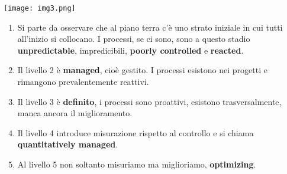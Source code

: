 \texttt{[image: img3.png]} %

\begin{enumerate}
	\item Si parte da osservare che al piano terra c'è uno strato iniziale in cui tutti all'inizio si collocano. I processi, se ci sono, sono a questo stadio \textbf{unpredictable}, impredicibili, \textbf{poorly controlled} e \textbf{reacted}.
	\item Il livello 2 è \textbf{managed}, cioè gestito. I processi esistono nei progetti e rimangono prevalentemente reattivi.
	\item  Il livello 3 è \textbf{definito}, i processi sono proattivi, esistono trasversalmente, manca ancora il miglioramento.
	\item Il livello 4 introduce misurazione rispetto al controllo e si chiama \textbf{quantitatively managed}.
	\item Al livello 5 non soltanto misuriamo ma miglioriamo, \textbf{optimizing}.
\end{enumerate}
